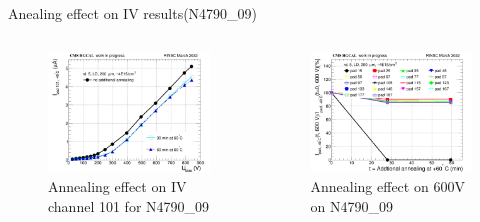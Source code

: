 \documentclass{beamer}
\begin{document}
\begin{frame}{Anealing effect on IV results(N4790\_09) }
  \begin{columns}
       \begin{figure}
           \includegraphics[width=1.0\textwidth]{plots/annealing_IV_ch101_N4790_09.png}
           \caption{Annealing effect on IV channel 101 for N4790\_09}
       \end{figure}
       \begin{figure}
           \includegraphics[width=1.0\textwidth]{plots/annealing_current_N4790_09.png}
           \caption{Annealing effect on 600V on N4790\_09}
       \end{figure}
   \end{columns}
\end{frame}
\end{document}
